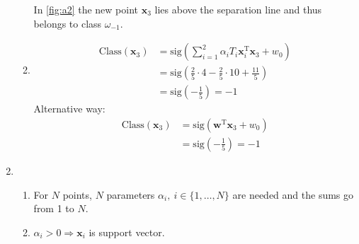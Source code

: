 \documentclass[DIN, pagenumber=false, fontsize=11pt, parskip=half]{scrartcl}
\begin{document}
\begin{enumerate}
\begin{enumerate}
            In \cref{fig:a2} the new point $\mathbf{x}_3$ lies above the separation line and thus belongs to class $\omega_{-1}$.
            \item
            \begin{align*}
                \text{Class}(\mathbf{x}_3) &= \text{sig}\left( \sum_{i=1}^2{\alpha_i T_i \mathbf{x}_i^\text{T} \mathbf{x}_3} + w_0 \right) \\
                &= \text{sig}\left( \frac{2}{5} \cdot 4 - \frac{2}{5} \cdot 10 + \frac{11}{5} \right) \\
                &= \text{sig}\left(-\frac{1}{5} \right) = -1
            \end{align*}
            Alternative way:
            \begin{align*}
                \text{Class}(\mathbf{x}_3) &= \text{sig}\left(\mathbf{w}^\text{T} \mathbf{x}_3 + w_0 \right) \\
                &= \text{sig}\left(-\frac{1}{5} \right) = -1
            \end{align*}
        \end{enumerate}
        \item
        \begin{enumerate}
            \item
            For $N$ points, $N$ parameters $\alpha_i, \ i \in \{1, \dots, N\}$ are needed and the sums go from 1 to $N$.
            \item
            $\alpha_i > 0 \Rightarrow \mathbf{x}_i$ is support vector.
        \end{enumerate}
    \end{enumerate}
    
\end{document}
